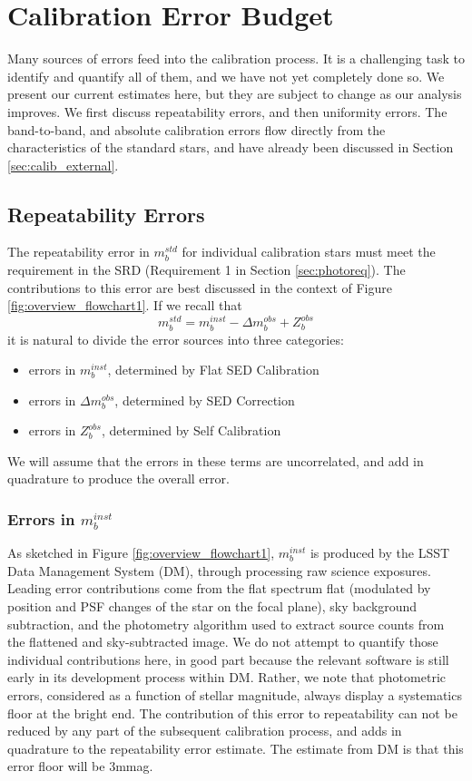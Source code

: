 \documentclass[12pt,preprint]{aastex}
\begin{document}
\section{Calibration Error Budget}
\label{sec:error_budget}
Many sources of errors feed into the calibration process.  It is a challenging task to identify and quantify all of them, and we have not yet completely done so.  We present our current estimates here, but they are subject to change as our analysis improves. We first
discuss repeatability errors, and then uniformity errors.   The band-to-band, and absolute calibration errors flow directly from the characteristics of the standard stars, and have already been discussed in Section \ref{sec:calib_external}.
\subsection{Repeatability Errors}
The repeatability error in $m_b^{std}$ for individual calibration stars must meet the requirement in the SRD (Requirement 1 in Section \ref{sec:photoreq}).  The contributions to this error are best discussed in the context of Figure \ref{fig:overview_flowchart1}.  If we recall that
\begin{equation}
m_b^{std} = m_b^{inst} - \Delta m_b^{obs} + Z_b^{obs}
\end{equation}
it is natural to divide the error sources into three categories:

\begin{itemize}
\item{errors in $m_b^{inst}$, determined by Flat SED Calibration}
\item{errors in $\Delta m_b^{obs}$, determined by SED Correction}
\item{errors in $Z_b^{obs}$, determined by Self Calibration}
\end{itemize}

We will assume that the errors in these terms are uncorrelated, and add in quadrature to produce the overall error.

\subsubsection{Errors in $m_b^{inst}$}
As sketched in Figure \ref{fig:overview_flowchart1}, $m_b^{inst}$ is produced by the LSST Data Management System (DM), through processing raw science exposures. Leading error contributions come from the flat spectrum flat (modulated by position and PSF
changes of the star on the focal plane), sky background subtraction, and the photometry algorithm used to extract source counts from the flattened and sky-subtracted image. We do not attempt to quantify those individual contributions here, in good part because the relevant software is still early in its development process within DM. Rather, we note that photometric errors, considered as a function of stellar magnitude, always display a systematics floor at the bright end. The contribution of this error to repeatability can not be reduced by any part of the subsequent calibration process, and adds in quadrature to the repeatability error estimate. The estimate from DM is that this error floor will be 3mmag. 
\end{document}
